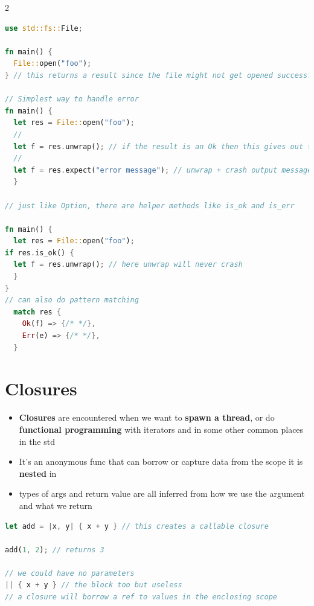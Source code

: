\documentclass{report}
\begin{document}
\begin{multicols*}{2}
\begin{tcolorbox}[title=Example,colback=backcolour,size=small,left=4mm]
\begin{lstlisting}[language=rust]
use std::fs::File;

fn main() {
  File::open("foo");
} // this returns a result since the file might not get opened successfully

// Simplest way to handle error
fn main() {
  let res = File::open("foo");
  //
  let f = res.unwrap(); // if the result is an Ok then this gives out the wanted file struct, if error, then this crashes to program
  //
  let f = res.expect("error message"); // unwrap + crash output message
  }

// just like Option, there are helper methods like is_ok and is_err

fn main() {
  let res = File::open("foo");
if res.is_ok() {
  let f = res.unwrap(); // here unwrap will never crash
  }
}
// can also do pattern matching
  match res {
    Ok(f) => {/* */},
    Err(e) => {/* */},
  }
\end{lstlisting}
\end{tcolorbox}


\section{Closures}

\begin{itemize}
  \item \textbf{Closures} are encountered when we want to \textbf{spawn a thread}, or do \textbf{functional programming} with iterators and in some other common places in the std 
  \item It's an anonymous func that can borrow or capture data from the scope it is \textbf{nested} in
  \item types of args and return value are all inferred from how we use the argument and what we return
\end{itemize}

\begin{tcolorbox}[title=Syntax,colback=backcolour,size=small,left=4mm]
\begin{lstlisting}[language=rust]
let add = |x, y| { x + y } // this creates a callable closure

add(1, 2); // returns 3

// we could have no parameters
|| { x + y } // the block too but useless
// a closure will borrow a ref to values in the enclosing scope


\end{lstlisting}
\end{tcolorbox}
\end{multicols*}
\end{document}
